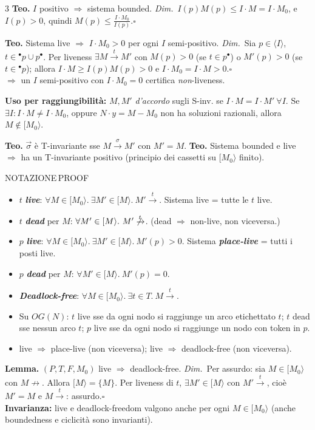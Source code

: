 \documentclass[8pt,a4paper]{extarticle}
\newcommand{\NOT}{\colorbox{black!12}{\tiny\textsf{NOTAZIONE}}}
\newcommand{\PRF}{\colorbox{pf!20}{\tiny\textsf{PROOF}}}
\newcommand{\topic}[2]{%
  \Needspace*{5\baselineskip}%
  \vspace{3pt}\noindent{\color{tit}\bfseries\footnotesize #1}\hfill #2\par
  \vspace{-1pt}{\color{tit}\rule{\linewidth}{0.6pt}}\par\vspace{1pt}}
\newcommand{\D}[1]{\textbf{\textit{#1}}}
\newcommand{\pre}[1]{{}^{\bullet}#1}
\newcommand{\post}[1]{#1^{\bullet}}
\newcommand{\pf}{{\color{pf}\textit{Dim.}}~}
\newcommand{\sq}{\hfill\ensuremath{\square}}
\begin{document}
\begin{multicols}{3}
\textbf{Teo.} $I$ positivo $\Rightarrow$ sistema bounded.
\pf $I(p)M(p)\le I\cdot M=I\cdot M_0$, e $I(p)>0$, quindi $M(p)\le \frac{I\cdot M_0}{I(p)}$.\sq

\textbf{Teo.} Sistema live $\Rightarrow$ $I\cdot M_0>0$ per ogni $I$ semi-positivo.
\pf Sia $p\in\langle I\rangle$, $t\in\pre{p}\cup\post{p}$. Per liveness $\exists M\xrightarrow{t}M'$ con $M(p)>0$ (se $t\in\post{p}$) o $M'(p)>0$ (se $t\in\pre{p}$); allora $I\cdot M\ge I(p)M(p)>0$ e $I\cdot M_0=I\cdot M>0$.\sq\\
$\Rightarrow$ un $I$ semi-positivo con $I\cdot M_0=0$ certifica \emph{non}-liveness.

\textbf{Uso per raggiungibilità:} $M,M'$ \emph{d'accordo} sugli S-inv. se $I\cdot M=I\cdot M'\ \forall I$. Se $\exists I: I\cdot M\neq I\cdot M_0$, oppure $N\cdot y=M-M_0$ non ha soluzioni razionali, allora $M\notin[M_0\rangle$.

\textbf{Teo.} $\vec{\sigma}$ è T-invariante sse $M\xrightarrow{\sigma}M'$ con $M'=M$.
\textbf{Teo.} Sistema bounded e live $\Rightarrow$ ha un T-invariante positivo (principio dei cassetti su $[M_0\rangle$ finito).

\topic{4. Liveness e Place-Liveness}{\NOT\,\PRF}
\begin{itemize}
\item $t$ \D{live}: $\forall M\in[M_0\rangle.\ \exists M'\in[M\rangle.\ M'\xrightarrow{t}$. Sistema live = tutte le $t$ live.
\item $t$ \D{dead} per $M$: $\forall M'\in[M\rangle.\ M'\not\xrightarrow{t}$. (dead $\Rightarrow$ non-live, non viceversa.)
\item $p$ \D{live}: $\forall M\in[M_0\rangle.\ \exists M'\in[M\rangle.\ M'(p)>0$. Sistema \D{place-live} = tutti i posti live.
\item $p$ \D{dead} per $M$: $\forall M'\in[M\rangle.\ M'(p)=0$.
\item \D{Deadlock-free}: $\forall M\in[M_0\rangle.\ \exists t\in T.\ M\xrightarrow{t}$.
\item Su $OG(N)$: $t$ live sse da ogni nodo si raggiunge un arco etichettato $t$; $t$ dead sse nessun arco $t$; $p$ live sse da ogni nodo si raggiunge un nodo con token in $p$.
\item live $\Rightarrow$ place-live (non viceversa); live $\Rightarrow$ deadlock-free (non viceversa).
\end{itemize}
\textbf{Lemma.} $(P,T,F,M_0)$ live $\Rightarrow$ deadlock-free.
\pf Per assurdo: sia $M\in[M_0\rangle$ con $M\not\rightarrow$. Allora $[M\rangle=\{M\}$. Per liveness di $t$, $\exists M'\in[M\rangle$ con $M'\xrightarrow{t}$, cioè $M'=M$ e $M\xrightarrow{t}$: assurdo.\sq\\
\textbf{Invarianza:} live e deadlock-freedom valgono anche per ogni $M\in[M_0\rangle$ (anche boundedness e ciclicità sono invarianti).


\end{multicols}
\end{document}
